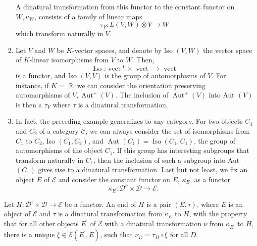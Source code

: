 \begin{example}
\begin{enumerate}
    A dinatural transformation from this functor to the constant functor on $W, \kappa_W$, consists of a family of linear maps
    $$
    \tau_V: L(V, W) \otimes V \rightarrow W
    $$
    which transform naturally in $V$.
    \item Let $V$ and $W$ be $K$-vector spaces, and denote by Iso $(V, W)$ the vector space of $K$-linear isomorphisms from $V$ to $W$. Then,
    $$
    \text { Iso : vect }{ }^0 \times \text { vect } \rightarrow \text { vect }
    $$
    is a functor, and Iso $(V, V)$ is the group of automorphisms of $V$. For instance, if $K=$ $\mathbb{R}$, we can consider the orientation preserving automorphisms of $V, \operatorname{Aut}^{+}(V)$. The inclusion of $\operatorname{Aut}^{+}(V)$ into Aut $(V)$ is then a $\tau_V$ where $\tau$ is a dinatural transformation. 
    \item In fact, the preceding example generalizes to any category. For two objects $C_1$ and $C_2$ of a category $\mathcal{C}$, we can always consider the set of isomorphisms from $C_1$ to $C_2$, Iso $\left(C_1, C_2\right)$, and $\operatorname{Aut}\left(C_1\right)=\operatorname{Iso}\left(C_1, C_1\right)$, the group of automorphisms of the object $C_1$. If this group has interesting subgroups that transform naturally in $C_1$, then the inclusion of such a subgroup into Aut $\left(C_1\right)$ gives rise to a dinatural transformation. Last but not least, we fix an object $E$ of $\mathcal{E}$ and consider the constant functor on $E$, $\kappa_E$, as a functor
    $$
    \kappa_E: \mathcal{D}^o \times \mathcal{D} \rightarrow \mathcal{E} \text {. }
    $$
\end{enumerate}

Let $H: \mathcal{D}^{\circ} \times \mathcal{D} \rightarrow \mathcal{E}$ be a functor. An end of $H$ is a pair $(E, \tau)$, where $E$ is an object of $\mathcal{E}$ and $\tau$ is a dinatural transformation from $\kappa_E$ to $H$, with the property that for all other objects $E^{\prime}$ of $\mathcal{E}$ with a dinatural transformation $\nu$ from $\kappa_{E^{\prime}}$ to $H$, there is a unique $\xi \in \mathcal{E}\left(E^{\prime}, E\right)$, such that $\nu_D=\tau_D \circ \xi$ for all $D$.


\end{example}
